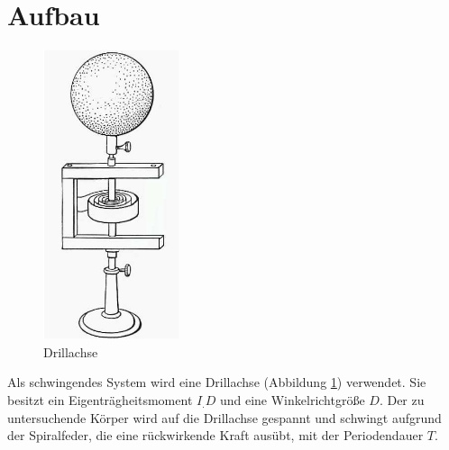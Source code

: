 \section{Aufbau}
\label{sec:Aufbau}

\begin{figure}
\centering
\includegraphics[width=4cm]{content/images/Drillachse.png} 
\caption{Drillachse\cite{V101}}
\label{fig:Drillachse}
\end{figure}
Als schwingendes System wird eine Drillachse (Abbildung \ref{fig:Drillachse}) verwendet. Sie besitzt ein Eigenträgheitsmoment $I_.D$ und eine Winkelrichtgröße $D$.
Der zu untersuchende Körper wird auf die Drillachse gespannt und schwingt aufgrund der Spiralfeder, die eine rückwirkende Kraft ausübt, mit der Periodendauer $T$.